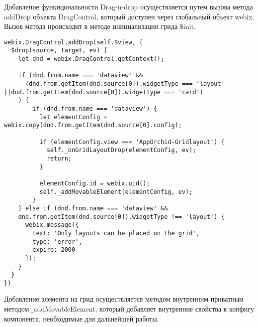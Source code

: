 Добавление функицональности Drag-n-drop осуществляется путем вызова метода addDrop объекта DragControl, который доступен через глобальный объект webix.
Вызов метода происходит в методе инициализации грида $\$$init.

\begin{lstlisting}
webix.DragControl.addDrop(self.$view, {
  $drop(source, target, ev) {
    let dnd = webix.DragControl.getContext();

    if (dnd.from.name === 'dataview' &&
      (dnd.from.getItem(dnd.source[0]).widgetType === 'layout' ||dnd.from.getItem(dnd.source[0]).widgetType === 'card')
    ) {
        if (dnd.from.name === 'dataview') {
          let elementConfig = webix.copy(dnd.from.getItem(dnd.source[0].config);

          if (elementConfig.view === 'AppOrchid-Gridlayout') {
            self._onGridLayoutDrop(elementConfig, ev);
            return;
          }

          elementConfig.id = webix.uid();
          self._addMovableElement(elementConfig, ev);
        }
    } else if (dnd.from.name === 'dataview' && 
    dnd.from.getItem(dnd.source[0]).widgetType !== 'layout') {
      webix.message({
        text: 'Only layouts can be placed on the grid',
        type: 'error',
        expire: 2000
      });
    }
  }
})
\end{lstlisting}

Добавление элемента на грид осуществляется методом внутренним приватным методом $\_$addMovableElement, который добавляет внутренние свойства к конфигу компонента, необходимые для дальнейшей работы.

